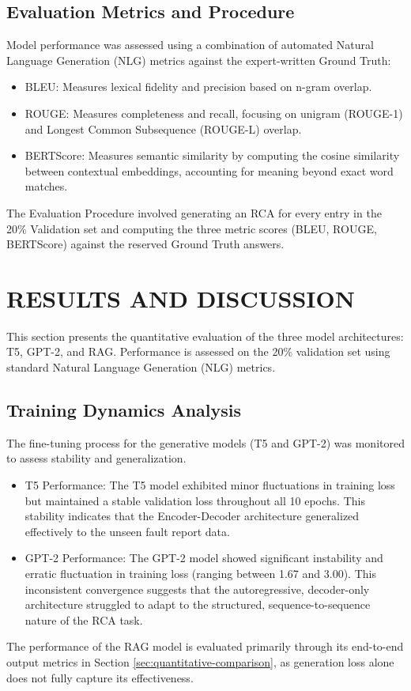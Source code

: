 \documentclass[10pt,twocolumn,journal]{IEEEtran}
\begin{document}
\subsection{Evaluation Metrics and Procedure}
\label{sec:evaluation}
Model performance was assessed using a combination of automated Natural Language Generation (NLG) metrics against the expert-written Ground Truth:
\begin{itemize}
    \item BLEU: Measures lexical fidelity and precision based on n-gram overlap.
    \item ROUGE: Measures completeness and recall, focusing on unigram (ROUGE-1) and Longest Common Subsequence (ROUGE-L) overlap.
    \item BERTScore: Measures semantic similarity by computing the cosine similarity between contextual embeddings, accounting for meaning beyond exact word matches.
\end{itemize}


The Evaluation Procedure involved generating an RCA for every entry in the 20\% Validation set and computing the three metric scores (BLEU, ROUGE, BERTScore) against the reserved Ground Truth answers.

\section{RESULTS AND DISCUSSION}
\label{sec:results}

This section presents the quantitative evaluation of the three model architectures: T5, GPT-2, and RAG. Performance is assessed on the 20\% validation set using standard Natural Language Generation (NLG) metrics.

\subsection{Training Dynamics Analysis}

The fine-tuning process for the generative models (T5 and GPT-2) was monitored to assess stability and generalization.

\begin{itemize}
    \item T5 Performance: The T5 model exhibited minor fluctuations in training loss but maintained a stable validation loss throughout all 10 epochs. This stability indicates that the Encoder-Decoder architecture generalized effectively to the unseen fault report data.
    \item GPT-2 Performance: The GPT-2 model showed significant instability and erratic fluctuation in training loss (ranging between 1.67 and 3.00). This inconsistent convergence suggests that the autoregressive, decoder-only architecture struggled to adapt to the structured, sequence-to-sequence nature of the RCA task.
\end{itemize}
The performance of the RAG model is evaluated primarily through its end-to-end output metrics in Section \ref{sec:quantitative-comparison}, as generation loss alone does not fully capture its effectiveness.
\end{document}
